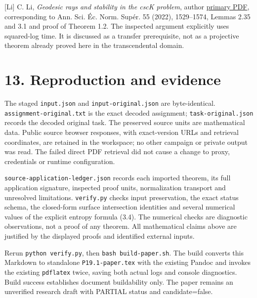\documentclass[
  11pt,
]{article}
\begin{document}
{[}Li{]} C. Li, \emph{Geodesic rays and stability in the cscK problem},
author
\href{https://sites.math.rutgers.edu/~cl1412/papers/maximal.pdf}{primary
PDF}, corresponding to Ann. Sci. Éc. Norm. Supér. 55 (2022), 1529--1574,
Lemmas 2.35 and 3.1 and proof of Theorem 1.2. The inspected argument
explicitly uses squared-log time. It is discussed as a transfer
prerequisite, not as a projective theorem already proved here in the
transcendental domain.

\section{13. Reproduction and evidence}\label{reproduction-and-evidence}

The staged \texttt{input.json} and \texttt{input-original.json} are
byte-identical. \texttt{assignment-original.txt} is the exact decoded
assignment; \texttt{task-original.json} records the decoded original
task. The preserved source units are mathematical data. Public source
browser responses, with exact-version URLs and retrieval coordinates,
are retained in the workspace; no other campaign or private output was
read. The failed direct PDF retrieval did not cause a change to proxy,
credentials or runtime configuration.

\texttt{source-application-ledger.json} records each imported theorem,
its full application signature, inspected proof units, normalization
transport and unresolved limitations. \texttt{verify.py} checks input
preservation, the exact status schema, the closed-form surface
intersection identities and several numerical values of the explicit
entropy formula (3.4). The numerical checks are diagnostic observations,
not a proof of any theorem. All mathematical claims above are justified
by the displayed proofs and identified external inputs.

Rerun \texttt{python\ verify.py}, then \texttt{bash\ build-paper.sh}.
The build converts this Markdown to standalone \texttt{P19.1-paper.tex}
with the existing Pandoc and invokes the existing \texttt{pdflatex}
twice, saving both actual logs and console diagnostics. Build success
establishes document buildability only. The paper remains an unverified
research draft with PARTIAL status and candidate=false.
\end{document}
